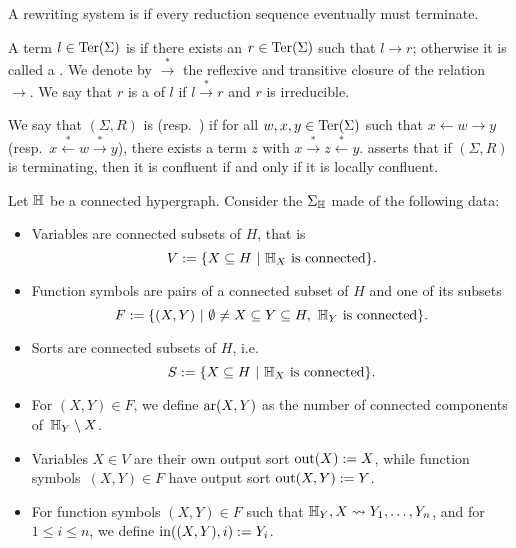 A rewriting system is  if every reduction sequence eventually must terminate.

A term $l \in \operatorname{Ter}(\Sigma)$ is  if there exists an $r \in \operatorname{Ter}(\Sigma)$ such that $l \to r$; otherwise it is called a .
We denote by $\overset{*}{\to}$ the reflexive and transitive closure of the relation~$\to$.
We say that $r$ is a  of $l$ if $l \overset{*}{\to} r$ and $r$ is irreducible.

We say that $(\Sigma,R)$ is  (resp.\ ) if for all $w,x,y \in \operatorname{Ter}(\Sigma)$ such that $x \leftarrow w \to y$ (resp.\ $x \overset{*}{\leftarrow} w \overset{*}{\to} y$), there exists a term $z$ with $x \overset{*}{\to} z \overset{*}{\leftarrow} y$.
 asserts that if $(\Sigma,R)$ is terminating, then it is confluent if and only if it is locally confluent.


\begin{definition} \label{def:signature-hyper}
  Let ${\mathbb H}$ be a connected hypergraph. 
Consider the  $\Sigma_{\mathbb H}$ made of the following data: 
\begin{itemize}
  \item Variables are connected subsets of $H$, that is $$V:=\{ X \subseteq H \ | \ \hyper{H}_{X} \text{ is connected}\}.$$ 
  \item Function symbols are pairs of a connected subset of $H$ and one of its subsets 
  $$F:=\{(X,Y) \ | \ \emptyset \neq X \subseteq Y \subseteq H, \ \hyper{H}_Y \text{ is connected}\}.$$
  \item Sorts are connected subsets of $H$, i.e. 
  $$S:=\{ X \subseteq H \ | \ {\mathbb H}_X \text{ is connected}\}.$$
  \item For $(X,Y) \in F$, we define $\mathrm{ar}(X,Y)$ as the number of connected components of~${\mathbb H}_Y\setminus X$.
  \item Variables $X \in V$ are their own output sort $\operatorname{out}(X):=X$, while function symbols~$(X,Y) \in F$ have output sort $\operatorname{out}(X,Y):=Y$.
  \item For function symbols $(X,Y) \in F$ such that ${\mathbb H}_Y,X \leadsto Y_1,\ldots,Y_n$, and for $1 \leq i \leq n$, we define $\operatorname{in}((X,Y),i):=Y_i$.
\end{itemize}
\end{definition}

